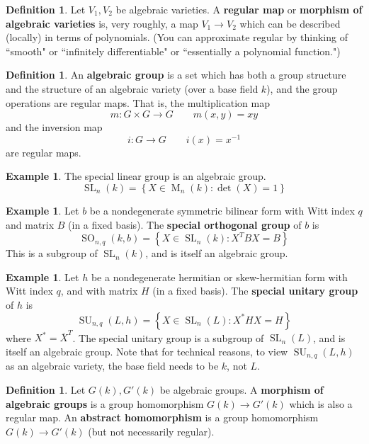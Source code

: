 \documentclass[12pt]{article}
\theoremstyle{definition}
\newtheorem{definition}[theorem]{Definition}
\newtheorem{example}[theorem]{Example}
\newcommand{\lb}{\left\{}
\newcommand{\rb}{\right\}}
\newcommand{\tbf}{\textbf}
\newcommand{\inv}{^{-1}}
\newcommand{\ov}{\overline}
\DeclareMathOperator{\M}{M}
\DeclareMathOperator{\SL}{SL}
\DeclareMathOperator{\SU}{SU}
\DeclareMathOperator{\SO}{SO}
\begin{document}
\begin{definition}
Let $V_1, V_2$ be algebraic varieties. A \tbf{regular map} or \tbf{morphism of algebraic varieties} is, very roughly, a map $V_1 \to V_2$ which can be described (locally) in terms of polynomials. (You can approximate regular by thinking of ``smooth" or ``infinitely differentiable" or ``essentially a polynomial function.")
\end{definition}

\begin{definition}
An \tbf{algebraic group} is a set which has both a group structure and the structure of an algebraic variety (over a base field $k$), and the group operations are regular maps. That is, the multiplication map
\[
	m:G \times G \to G \qquad m(x,y) = xy
\]
and the inversion map
\[
	i:G \to G \qquad i(x) = x \inv
\]
are regular maps.
\end{definition}

\begin{example}
The special linear group is an algebraic group.
\[
	\SL_n(k) = \lb X \in \M_n(k) : \det(X) = 1 \rb
\]
\end{example}

\begin{example}
Let $b$ be a nondegenerate symmetric bilinear form with Witt index $q$ and matrix $B$ (in a fixed basis). The \tbf{special orthogonal group} of $b$ is
\[
	\SO_{n,q}(k,b) = \lb X \in \SL_n(k) : X^T B X = B \rb
\]
This is a subgroup of $\SL_n(k)$, and is itself an algebraic group.
\end{example}

\begin{example}
Let $h$ be a nondegenerate hermitian or skew-hermitian form with Witt index $q$, and with matrix $H$ (in a fixed basis). The \tbf{special unitary group} of $h$ is
\[
	\SU_{n,q}(L,h) = \lb X \in \SL_n(L) : X^* H X = H \rb
\]
where $X^* = \ov X^T$. The special unitary group is a subgroup of $\SL_n(L)$, and is itself an algebraic group. Note that for technical reasons, to view $\SU_{n,q}(L,h)$ as an algebraic variety, the base field needs to be $k$, not $L$.
\end{example}

\begin{definition}
Let $G(k), G'(k)$ be algebraic groups. A \tbf{morphism of algebraic groups} is a group homomorphism $G(k) \to G'(k)$ which is also a regular map. An \tbf{abstract homomorphism} is a group homomorphism $G(k) \to G'(k)$ (but not necessarily regular).
\end{definition}
\end{document}
